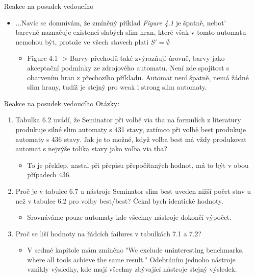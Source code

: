 \documentclass[
]{beamer}
\begin{document}
	\begin{frame}{Reakce na posudek vedoucího}
		\begin{itemize}
		\item $\ldots$Navíc se domnívám, že zmíněný příklad \emph{Figure 4.1} je špatně, nebot’ barevně naznačuje existenci slabých slim hran, které však v tomto automatu nemohou být, protože ve všech stavech platí $S'= \emptyset$
		\begin{itemize}
		\item Figure 4.1 -> Barvy přechodů také zvýrazňují úrovně, barvy jako akceptační podmínky ze zdrojového automatu. Není zde spojitost s obarvením hran z přechozího příkladu. Automat není špatně, nemá žádné slim hrany, tudíž je stejný pro weak i strong slim automaty.
		\end{itemize}
	\end{itemize}

		
		
	\end{frame}
	
	\begin{frame}{Reakce na posudek vedoucího}		
		Otázky:
		\begin{enumerate}
			\item Tabulka 6.2 uvádí, že Seminator při volbě via tba na formulích z literatury produkuje silné slim automaty s 431 stavy, zatímco při volbě best produkuje automaty s 436 stavy. Jak je to možné, když volba best má vždy produkovat automat s nejvýše tolika stavy jako volba via tba?
			\begin{itemize}
				\item To je překlep, nastal při přepisu přepočítaných hodnot, má to být v obou případech 436.
			\end{itemize}
			\pause
			\item Proč je v tabulce 6.7 u nástroje Seminator slim best uveden nižší počet stav u než v tabulce 6.2 pro volby best/best? Čekal bych identické hodnoty.
			\begin{itemize}
				\item Srovnáváme pouze automaty kde všechny nástroje dokončí výpočet.
			\end{itemize}
			
			\pause
			\item Proč se liší hodnoty na řádcích failures v tabulkách 7.1 a 7.2?
			\begin{itemize}
				\item V sedmé kapitole mám zmíněno "We exclude uninteresting benchmarks, where all tools achieve the same result." 
				Odebráním jednoho nástroje vznikly výsledky, kde mají všechny zbývající nástroje stejný výsledek.
			\end{itemize}
			
		\end{enumerate}
		
		
	\end{frame}
	
\end{document}
